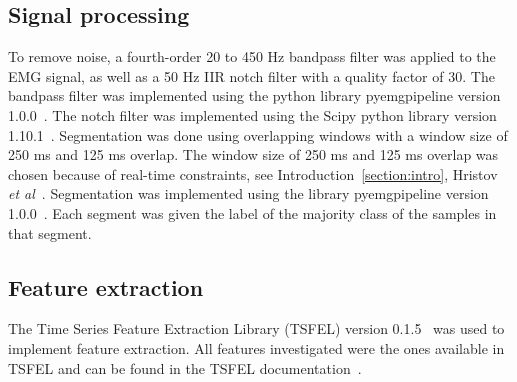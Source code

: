 \subsection{Signal processing}
To remove noise, a fourth-order 20 to 450 Hz bandpass filter was applied to the EMG signal, as well as a 50 Hz IIR notch filter with a quality factor of 30.
The bandpass filter was implemented using the python library pyemgpipeline version 1.0.0~\cite{PyEMGPipelinePythonPackage2022}. The notch filter was implemented using the Scipy python library version 1.10.1~\cite{2020SciPy-NMeth}.
Segmentation was done using overlapping windows with a window size of 250 ms and 125 ms overlap. The window size of 250 ms and 125 ms overlap was chosen because of real-time constraints, see Introduction~\ref{section:intro}, Hristov \textit{et al}~\cite{hristovClassificationIndividualCombined2022}. 
Segmentation was implemented using the library pyemgpipeline version 1.0.0~\cite{PyEMGPipelinePythonPackage2022}. 
Each segment was given the label of the majority class of the samples in that segment.



\subsection{Feature extraction}
The Time Series Feature Extraction Library (TSFEL) version 0.1.5~\cite{barandas2020tsfel} was used to implement feature extraction. All features investigated were the ones available in TSFEL and can be found in the TSFEL documentation~\cite{barandas2020tsfel}. 

